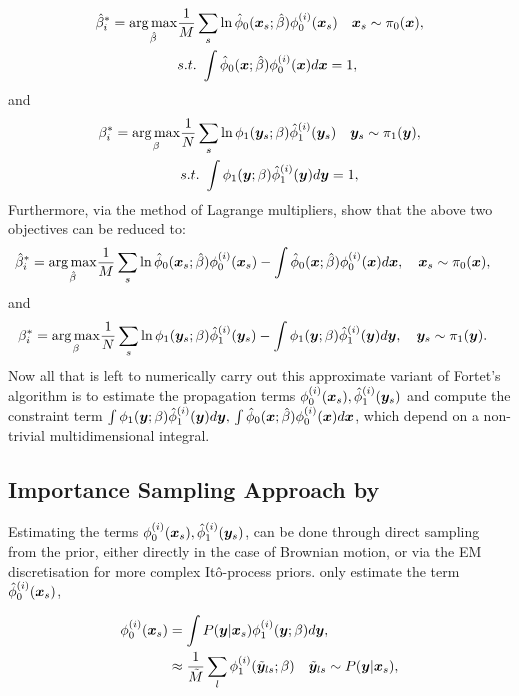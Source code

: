\documentclass[a4paper,12pt,twoside,openright]{report}
\theoremstyle{definition}
\begin{document}
\begin{align}
    \hat{\beta}^*_i = \operatorname*{arg\,max}_{\hat{\beta} } &\frac{1}{M} \sum_s \operatorname{ln} {\hat{\phi}}_0({\bm{x}}_s; \hat{\beta} )   \phi_0^{(i)}({\bm{x}}_s)
    \quad {\bm{x}}_s\sim \pi_0({\bm{x}}), \nonumber \\
   & s.t. \text{ }  \int {\hat{\phi}}_0({\bm{x}}; \hat{\beta} )   \phi_0^{(i)}({\bm{x}}) d{\bm{x}} =1,
\end{align}
and
\begin{align}
    {\beta}^*_i = \operatorname*{arg\,max}_{{\beta} } &\frac{1}{N} \sum_s \operatorname{ln} \phi_1({\bm{y}}_s; {\beta} )   {\hat{\phi}}_1^{(i)}({\bm{y}}_s)
    \quad {\bm{y}}_s\sim \pi_1({\bm{y}}), \nonumber \\
   & s.t. \text{ }  \int \phi_1({\bm{y}}; {\beta} )   {\hat{\phi}}_1^{(i)}({\bm{y}}) d{\bm{y}} =1,
\end{align}
Furthermore, via the method of Lagrange multipliers, \cite{pavon2018data} show that the above two objectives can be reduced to:
\begin{align}
    \hat{\beta}^*_i = \operatorname*{arg\,max}_{\hat{\beta} } &\frac{1}{M} \sum_s \operatorname{ln} {\hat{\phi}}_0({\bm{x}}_s; \hat{\beta} )   \phi_0^{(i)}({\bm{x}}_s)- \int {\hat{\phi}}_0({\bm{x}}; \hat{\beta} )   \phi_0^{(i)}({\bm{x}}) d{\bm{x}} ,
    \quad {\bm{x}}_s\sim \pi_0({\bm{x}}) ,  \nonumber 
\end{align}
and
\begin{align}
    {\beta}^*_i = \operatorname*{arg\,max}_{{\beta} } &\frac{1}{N} \sum_s \operatorname{ln} \phi_1({\bm{y}}_s; {\beta} )   {\hat{\phi}}_1^{(i)}({\bm{y}}_s)- \int \phi_1({\bm{y}}; {\beta} )   {\hat{\phi}}_1^{(i)}({\bm{y}}) d{\bm{y}} ,
    \quad {\bm{y}}_s\sim \pi_1({\bm{y}}). \nonumber 
\end{align}
Now all that is left to numerically carry out this approximate variant of Fortet's algorithm is to estimate the propagation terms $ \phi_0^{(i)}({\bm{x}}_s), {\hat{\phi}}_1^{(i)}({\bm{y}}_s)$ and compute the constraint term $\int \phi_1({\bm{y}}; {\beta} )   {\hat{\phi}}_1^{(i)}({\bm{y}}) d{\bm{y}}, \, \int {\hat{\phi}}_0({\bm{x}}; \hat{\beta} )   \phi_0^{(i)}({\bm{x}}) d{\bm{x}}$, which depend on a non-trivial multidimensional integral.


\subsection{Importance Sampling Approach by \citet{pavon2018data} }

Estimating the terms $ \phi_0^{(i)}({\bm{x}}_s), {\hat{\phi}}_1^{(i)}({\bm{y}}_s)$, can be done through direct sampling from the prior, either directly in the case of Brownian motion, or via the EM discretisation for more complex Itô-process priors. \cite{pavon2018data} only estimate the term ${\hat{\phi}}_0^{(i)}({\bm{x}}_s)$,

\begin{align}\label{eq:pavon_transition_mc}
    \phi_0^{(i)}({\bm{x}}_s) &= \int P({\bm{y}}| {\bm{x}}_s) \phi_1^{(i)}({\bm{y}}; \beta) d{\bm{y}}, \nonumber \\
    &\approx \frac{1}{\tilde{M}} \sum_l \phi_1^{(i)}(\tilde{{\bm{y}}}_{ls}; \beta) \quad \tilde{{\bm{y}}}_{ls} \sim   P({\bm{y}}| {\bm{x}}_s),
\end{align}
\end{document}
